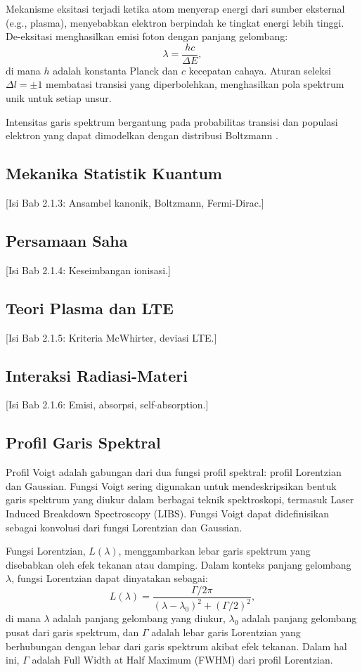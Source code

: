 Mekanisme eksitasi terjadi ketika atom menyerap energi dari sumber eksternal (e.g., plasma), menyebabkan elektron berpindah ke tingkat energi lebih tinggi. De-eksitasi menghasilkan emisi foton dengan panjang gelombang:
\begin{equation}
\lambda = \frac{hc}{\Delta E},
\end{equation}
di mana $h$ adalah konstanta Planck dan $c$ kecepatan cahaya. Aturan seleksi $\Delta l = \pm 1$ \cite{Liboff2003} membatasi transisi yang diperbolehkan, menghasilkan pola spektrum unik untuk setiap unsur.

Intensitas garis spektrum bergantung pada probabilitas transisi dan populasi elektron yang dapat dimodelkan dengan distribusi Boltzmann \cite{Demtroder2010}.

\subsection{Mekanika Statistik Kuantum}
[Isi Bab 2.1.3: Ansambel kanonik, Boltzmann, Fermi-Dirac.]

\subsection{Persamaan Saha}
[Isi Bab 2.1.4: Keseimbangan ionisasi.]

\subsection{Teori Plasma dan LTE}
[Isi Bab 2.1.5: Kriteria McWhirter, deviasi LTE.]

\subsection{Interaksi Radiasi-Materi}
[Isi Bab 2.1.6: Emisi, absorpsi, self-absorption.]

\subsection{Profil Garis Spektral}
Profil Voigt adalah gabungan dari dua fungsi profil spektral: profil Lorentzian dan Gaussian. Fungsi Voigt sering digunakan untuk mendeskripsikan bentuk garis spektrum yang diukur dalam berbagai teknik spektroskopi, termasuk Laser Induced Breakdown Spectroscopy (LIBS). Fungsi Voigt dapat didefinisikan sebagai konvolusi dari fungsi Lorentzian dan Gaussian.

Fungsi Lorentzian, \( L(\lambda) \), menggambarkan lebar garis spektrum yang disebabkan oleh efek tekanan atau damping. Dalam konteks panjang gelombang \( \lambda \), fungsi Lorentzian dapat dinyatakan sebagai:
\begin{equation}
L(\lambda) = \frac{\Gamma / 2\pi}{(\lambda - \lambda_0)^2 + (\Gamma / 2)^2},
\end{equation}
di mana \( \lambda \) adalah panjang gelombang yang diukur, \( \lambda_0 \) adalah panjang gelombang pusat dari garis spektrum, dan \( \Gamma \) adalah lebar garis Lorentzian yang berhubungan dengan lebar dari garis spektrum akibat efek tekanan. Dalam hal ini, \( \Gamma \) adalah Full Width at Half Maximum (FWHM) dari profil Lorentzian.

